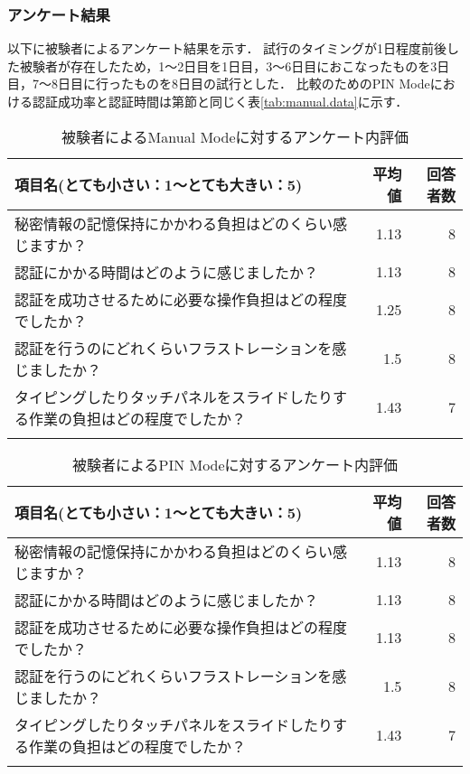 \subsubsection{アンケート結果}
以下に被験者によるアンケート結果を示す．
試行のタイミングが1日程度前後した被験者が存在したため，1〜2日目を1日目，3〜6日目におこなったものを3日目，7〜8日目に行ったものを8日目の試行とした．
比較のためのPIN Modeにおける認証成功率と認証時間は第\label{sec:vsManual}節と同じく表\ref{tab:manual.data}に示す．
\begin{table}[t]
  \caption{被験者によるManual Modeに対するアンケート内評価}
  \label{tab:manual.enquete}
  \begin{center}
    \small
    \begin{tabular}{lrr}
      \bhline
      項目名(とても小さい：1〜とても大きい：5) & 平均値 & 回答者数 \\ \hline
      秘密情報の記憶保持にかかわる負担はどのくらい感じますか？ & 1.13 & 8 \\
      認証にかかる時間はどのように感じましたか？ & 1.13 & 8 \\
      認証を成功させるために必要な操作負担はどの程度でしたか？ & 1.25 & 8 \\
      認証を行うのにどれくらいフラストレーションを感じましたか？ & 1.5 & 8 \\
      タイピングしたりタッチパネルをスライドしたりする作業の負担はどの程度でしたか？ & 1.43 & 7 \\
      \bhline
    \end{tabular}
  \end{center}
\end{table}
\begin{table}[b]
  \caption{被験者によるPIN Modeに対するアンケート内評価}
  \label{tab:pin.enquete}
  \begin{center}
    \small
    \begin{tabular}{lrr}
      \bhline
      項目名(とても小さい：1〜とても大きい：5) & 平均値 & 回答者数 \\ \hline
      秘密情報の記憶保持にかかわる負担はどのくらい感じますか？ & 1.13 & 8 \\
      認証にかかる時間はどのように感じましたか？ & 1.13 & 8 \\
      認証を成功させるために必要な操作負担はどの程度でしたか？ & 1.13 & 8 \\
      認証を行うのにどれくらいフラストレーションを感じましたか？ & 1.5 & 8 \\
      タイピングしたりタッチパネルをスライドしたりする作業の負担はどの程度でしたか？ & 1.43 & 7 \\
      \bhline
    \end{tabular}
  \end{center}
\end{table}

